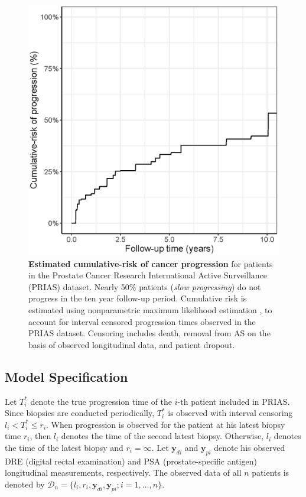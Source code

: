 \begin{figure}[!htb]
\captionsetup{justification=justified}
\centerline{\includegraphics[width=\columnwidth]{images/npmle_plot.eps}}
\caption{\textbf{Estimated cumulative-risk of cancer progression} for patients in the Prostate Cancer Research International Active Surveillance (PRIAS) dataset. Nearly 50\% patients (\textit{slow progressing}) do not progress in the ten year follow-up period. Cumulative risk is estimated using nonparametric maximum likelihood estimation \citep{turnbull1976empirical}, to account for interval censored progression times observed in the PRIAS dataset. Censoring includes death, removal from AS on the basis of observed longitudinal data, and patient dropout.}
\label{fig:npmle_plot}
\end{figure}

\subsection{Model Specification}
Let $T_i^*$ denote the true progression time of the ${i\mbox{-th}}$ patient included in PRIAS. Since biopsies are conducted periodically, $T_i^*$ is observed with interval censoring ${l_i < T_i^* \leq r_i}$. When progression is observed for the patient at his latest biopsy time $r_i$, then $l_i$ denotes the time of the second latest biopsy. Otherwise, $l_i$ denotes the time of the latest biopsy and ${r_i=\infty}$. Let $\boldsymbol{y}_{di}$ and $\boldsymbol{y}_{pi}$ denote his observed DRE (digital rectal examination) and PSA (prostate-specific antigen) longitudinal measurements, respectively. The observed data of all $n$ patients is denoted by ${\mathcal{D}_n = \{l_i, r_i, \boldsymbol{y}_{di}, \boldsymbol{y}_{pi}; i = 1, \ldots, n\}}$.

